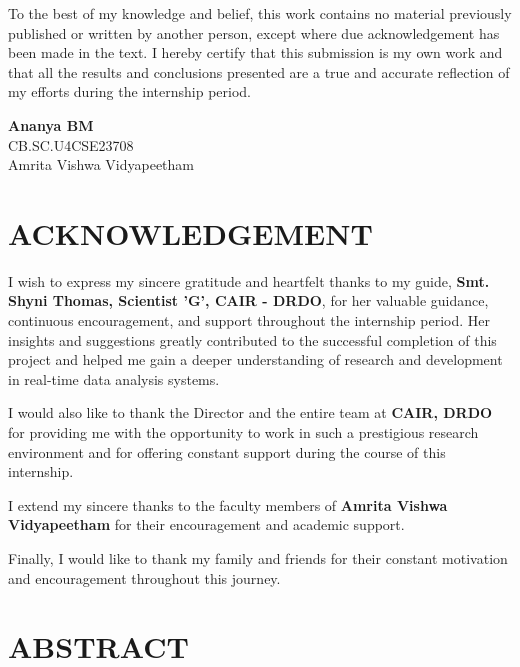 \documentclass[12pt,a4paper]{report}
\begin{document}
To the best of my knowledge and belief, this work contains no material previously published or written by another person, except where due acknowledgement has been made in the text. I hereby certify that this submission is my own work and that all the results and conclusions presented are a true and accurate reflection of my efforts during the internship period.

\vspace{2cm}

\begin{flushright}

\textbf{Ananya BM}\\
CB.SC.U4CSE23708\\
Amrita Vishwa Vidyapeetham

\end{flushright}


\chapter*{ACKNOWLEDGEMENT}

I wish to express my sincere gratitude and heartfelt thanks to my guide, \textbf{Smt. Shyni Thomas, Scientist 'G', CAIR - DRDO}, for her valuable guidance, continuous encouragement, and support throughout the internship period. Her insights and suggestions greatly contributed to the successful completion of this project and helped me gain a deeper understanding of research and development in real-time data analysis systems.

I would also like to thank the Director and the entire team at \textbf{CAIR, DRDO} for providing me with the opportunity to work in such a prestigious research environment and for offering constant support during the course of this internship.

I extend my sincere thanks to the faculty members of \textbf{Amrita Vishwa Vidyapeetham} for their encouragement and academic support.

Finally, I would like to thank my family and friends for their constant motivation and encouragement throughout this journey.


\chapter*{ABSTRACT}
\end{document}
